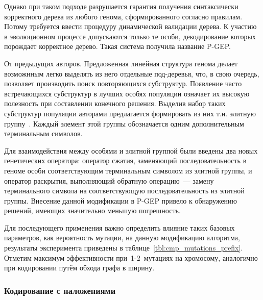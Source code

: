 Однако при таком подходе разрушается гарантия получения синтаксически корректного дерева из любого генома, сформированного согласно правилам. Потому требуется ввести процедуру динамической валидации дерева. К участию в эволюционном процессе допускаются только те особи, декодирование которых порождает корректное дерево. Такая система получила название P-GEP.

От предыдущих авторов. Предложенная линейная структура генома делает возможнным легко выделять из него отдельные под-деревья, что, в свою очередь, позволяет производить поиск повторяющихся субструктур. Появление часто встречающихся субструктур в лучших особях популяции означает их высокую полезность при составлении конечного решения. Выделив набор таких субструктур популяции авторами предлагается формировать из них т.н. элитную группу~\cite{Substructures(ICMLA05)_XLi}. Каждый элемент этой группы обозначается одним дополнительным терминальным символов.

Для взаимодействия между особями и элитной группой были введены два новых генетических оператора: оператор сжатия, заменяющий последовательность в геноме особи соответствующим терминальным символом из элитной группы, и оператор раскрытия, выполняющий обратную операцию~--- замену терминального символа на соответствующую последовательность из элитной группы.
Внесение данной модификации в P-GEP привело к обнаружению решений, имеющих значительно меньшую погрешность.

Для последующего применения важно определить влияние таких базовых параметров, как вероятность мутации, на данную модификацию алгоритма, результаты эксперимента приведены в таблице~\ref{tbl:cmp_mutations_prefix}. Отметим максимум эффективности при~1-2~мутациях на хромосому, аналогично при кодировании путём обхода графа в ширину.




\subsubsection{Кодирование с наложениями}


